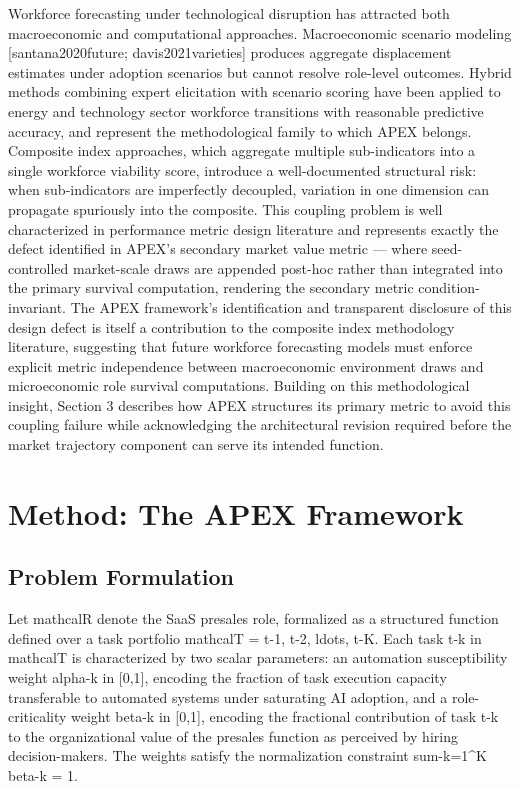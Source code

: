 \documentclass[10pt, conference]{IEEEtran}
\begin{document}
Workforce forecasting under technological disruption has attracted both macroeconomic and computational approaches. Macroeconomic scenario modeling [santana2020future; davis2021varieties] produces aggregate displacement estimates under adoption scenarios but cannot resolve role-level outcomes. Hybrid methods combining expert elicitation with scenario scoring \cite{wiser2021expert} have been applied to energy and technology sector workforce transitions with reasonable predictive accuracy, and represent the methodological family to which APEX belongs. Composite index approaches, which aggregate multiple sub-indicators into a single workforce viability score, introduce a well-documented structural risk: when sub-indicators are imperfectly decoupled, variation in one dimension can propagate spuriously into the composite. This coupling problem is well characterized in performance metric design literature \cite{virtanen2020scipy} and represents exactly the defect identified in APEX's secondary market value metric --- where seed-controlled market-scale draws are appended post-hoc rather than integrated into the primary survival computation, rendering the secondary metric condition-invariant. The APEX framework's identification and transparent disclosure of this design defect is itself a contribution to the composite index methodology literature, suggesting that future workforce forecasting models must enforce explicit metric independence between macroeconomic environment draws and microeconomic role survival computations. Building on this methodological insight, Section 3 describes how APEX structures its primary metric to avoid this coupling failure while acknowledging the architectural revision required before the market trajectory component can serve its intended function.

\section{Method: The APEX Framework}

\label{sec:method\_the\_apex\_framework}

\subsection{Problem Formulation}

\label{sec:problem\_formulation}

Let mathcalR denote the SaaS presales role, formalized as a structured function defined over a task portfolio mathcalT = t-1, t-2, ldots, t-K. Each task t-k in mathcalT is characterized by two scalar parameters: an automation susceptibility weight alpha-k in [0,1], encoding the fraction of task execution capacity transferable to automated systems under saturating AI adoption, and a role-criticality weight beta-k in [0,1], encoding the fractional contribution of task t-k to the organizational value of the presales function as perceived by hiring decision-makers. The weights satisfy the normalization constraint sum-k=1^K beta-k = 1.
\end{document}
